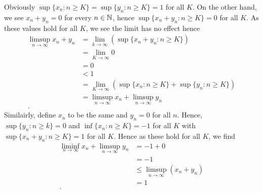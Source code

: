 \documentclass[a4paper]{article}
\begin{document}
\begin{solution}[19]
Obviously \(\sup \{ x_{n} : n \ge K \} = \sup \{ y_{n} : n\ge K \} = 1\) for all \(K\). On the other hand, we see \(x_{n} + y_{n} = 0\) for every \(n \in \mathbb{N}\), hence \(\sup \{ x_{n} + y_{n} : n \ge K \}  = 0\) for all \(K\). As these values hold for all \(K\), we see the limit has no effect hence
\begin{align*}
	\limsup_{n \to \infty} x_{n} + y_{n} &= \lim_{k \to \infty}\left( \sup \{ x_{n} + y_{n} : n \ge K \}  \right) \\
&= \lim_{K \to \infty} 0 \\
&= 0 \\
&< 1\\
&= \lim_{K \to \infty}(\sup \{ x_{n} : n\ge K \}  + \sup \{ y_{n} : n\ge K \} ) \\
&= \limsup_{n \to \infty} x_{n} + \limsup_{n \to \infty} y_{n} \\
.\end{align*}
Similairly, define \(x_{n}\) to be the same and \(y_{n} = 0\) for all \(n\). Hence, \(\sup \{ y_{n} :  n\ge k \} = 0\) and \(\inf \{ x_{n} : n\ge K \} = -1\) for all \(K\) with \(\sup \{ x_{n} + y_{n} : n \ge K \} = 1\) for all \(K\). Hence as these hold for all \(K\), we find
\begin{align*}
	\liminf_{n \to \infty} x_{n} + \limsup_{n \to \infty} y_{n} &= -1 + 0 \\
	&= -1 \\
	&\le \limsup_{n \to \infty} \left( x_{n} + y_{n} \right)\\
	&= 1 \\
.\end{align*}
\end{solution}
\newpage
\end{document}

